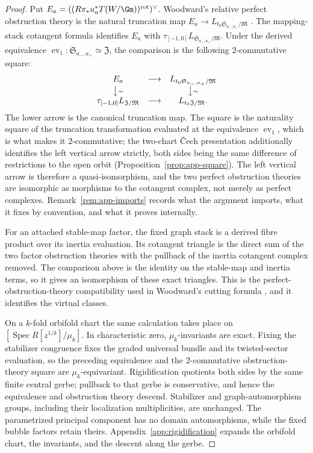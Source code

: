 \begin{proof}
Put
\(E_a=((R\pi_*u_a^*T(W/\Gm))^{\mathrm{rot}})^\vee\).  Woodward's relative
perfect obstruction theory is the natural truncation map
\(E_a\to L_{t_0\mathfrak S_{a_-,a_+}/\mathfrak M}\)
\cite[Definition~7.13]{WoodwardQKIII}.  The mapping-stack cotangent formula
identifies \(E_a\) with
\(\tau_{[-1,0]}L_{\mathfrak S_{a_-,a_+}/\mathfrak M}\).  Under the derived
equivalence \(\operatorname{ev}_1:\mathfrak S_{a_-,a_+}\simeq\mathfrak Z\),
the comparison is the following \(2\)-commutative square:
\[
\begin{array}{ccc}
 E_a & \longrightarrow & L_{t_0\mathfrak S_{a_-,a_+}/\mathfrak M}\\
 \big\downarrow\scriptstyle\sim && \big\downarrow\scriptstyle\sim\\
 \tau_{[-1,0]}L_{\mathfrak Z/\mathfrak M}
   & \longrightarrow & L_{t_0\mathfrak Z/\mathfrak M}.
\end{array}
\]
The lower arrow is the canonical truncation map.  The square is the
naturality square of the truncation transformation evaluated at the
equivalence \(\operatorname{ev}_1\), which is what makes it
\(2\)-commutative; the two-chart \v{C}ech presentation additionally
identifies the left vertical arrow strictly, both sides being the same
difference of restrictions to the open orbit
(Proposition~\ref{prop:app-square}).  The left vertical arrow is therefore a
quasi-isomorphism, and the two perfect obstruction theories are isomorphic as
morphisms to the cotangent complex, not merely as perfect complexes.
Remark~\ref{rem:app-imports} records what the argument imports, what it
fixes by convention, and what it proves internally.

For an attached stable-map factor, the fixed graph stack is a derived fibre
product over its inertia evaluation.  Its cotangent triangle is the direct
sum of the two factor obstruction theories with the pullback of the inertia
cotangent complex removed.  The comparison above is the identity on the
stable-map and inertia terms, so it gives an isomorphism of these exact
triangles.  This is the perfect-obstruction-theory compatibility used in
Woodward's cutting formula
\cite[Proposition~7.14]{WoodwardQKIII}, and it identifies the virtual classes.

On a \(k\)-fold orbifold chart the same calculation takes place on
\([\operatorname{Spec}R[z^{1/k}]/\mu_k]\).  In characteristic zero,
\(\mu_k\)-invariants are exact.  Fixing the stabilizer congruence fixes the
graded universal bundle and its twisted-sector evaluation, so the preceding
equivalence and the \(2\)-commutative obstruction-theory square are
\(\mu_k\)-equivariant.  Rigidification quotients both sides by the same finite
central gerbe; pullback to that gerbe is conservative, and hence the
equivalence and obstruction theory descend.  Stabilizer and graph-automorphism
groups, including their localization multiplicities, are unchanged.  The
parametrized principal component has no domain automorphisms, while the fixed
bubble factors retain theirs.  Appendix~\ref{app:rigidification} expands the
orbifold chart, the invariants, and the descent along the gerbe.


\end{proof}
